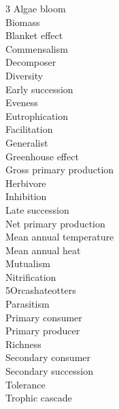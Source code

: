 
\begin{multicols}{3}
Algae bloom \\
Biomass \\
Blanket effect \\
Commensalism \\
Decomposer \\
Diversity \\
Early succession \\
Eveness \\
Eutrophication \\
Facilitation \\
Generalist \\
Greenhouse effect \\
Gross primary production \\
Herbivore \\
Inhibition \\
Late succession \\
Net primary production \\
Mean annual temperature \\
Mean annual heat \\
Mutualism \\
Nitrification \\
5Orcashateotters \\
Parasitism \\
Primary consumer \\
Primary producer \\
Richness \\
Secondary consumer \\
Secondary succession \\
Tolerance \\
Trophic cascade

\end{multicols}
